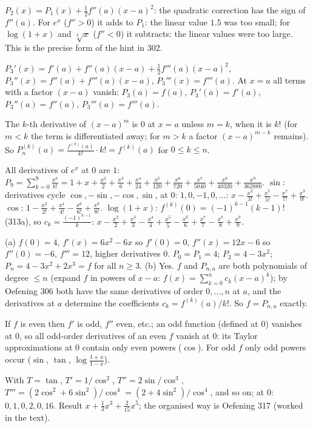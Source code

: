  $P_2(x)=P_1(x)+\frac12f''(a)(x-a)^2$: the quadratic correction has the sign of $f''(a)$. For $e^x$ ($f''>0$) it adds to $P_1$: the linear value $1.5$ was too small; for $\log(1+x)$ and $\sqrt[3]x$ ($f''<0$) it subtracts: the linear values were too large. This is the precise form of the hint in 302.

 $P_3'(x)=f'(a)+f''(a)(x-a)+\frac12f'''(a)(x-a)^2$, $P_3''(x)=f''(a)+f'''(a)(x-a)$, $P_3'''(x)=f'''(a)$. At $x=a$ all terms with a factor $(x-a)$ vanish: $P_3(a)=f(a)$, $P_3'(a)=f'(a)$, $P_3''(a)=f''(a)$, $P_3'''(a)=f'''(a)$.

 The $k$-th derivative of $(x-a)^m$ is $0$ at $x=a$ unless $m=k$, when it is $k!$ (for $m<k$ the term is differentiated away; for $m>k$ a factor $(x-a)^{m-k}$ remains). So $P_n^{(k)}(a)=\frac{f^{(k)}(a)}{k!}\cdot k!=f^{(k)}(a)$ for $0\le k\le n$.

 All derivatives of $e^x$ at $0$ are $1$: $P_9=\sum_{k=0}^9\frac{x^k}{k!}=1+x+\frac{x^2}2+\frac{x^3}6+\frac{x^4}{24}+\frac{x^5}{120}+\frac{x^6}{720}+\frac{x^7}{5040}+\frac{x^8}{40320}+\frac{x^9}{362880}$. $\sin$: derivatives cycle $\cos,-\sin,-\cos,\sin$, at $0$: $1,0,-1,0,\dots$: $x-\frac{x^3}{3!}+\frac{x^5}{5!}-\frac{x^7}{7!}+\frac{x^9}{9!}$. $\cos$: $1-\frac{x^2}{2!}+\frac{x^4}{4!}-\frac{x^6}{6!}+\frac{x^8}{8!}$. $\log(1+x)$: $f^{(k)}(0)=(-1)^{k-1}(k-1)!$ (313a), so $c_k=\frac{(-1)^{k-1}}k$: $x-\frac{x^2}2+\frac{x^3}3-\frac{x^4}4+\frac{x^5}5-\frac{x^6}6+\frac{x^7}7-\frac{x^8}8+\frac{x^9}9$.

 (a) $f(0)=4$, $f'(x)=6x^2-6x$ so $f'(0)=0$, $f''(x)=12x-6$ so $f''(0)=-6$, $f'''=12$, higher derivatives $0$. $P_0=P_1=4$; $P_2=4-3x^2$; $P_n=4-3x^2+2x^3=f$ for all $n\ge3$. (b) Yes. $f$ and $P_{n,a}$ are both polynomials of degree $\le n$ (expand $f$ in powers of $x-a$: $f(x)=\sum_{k=0}^nc_k(x-a)^k$); by Oefening 306 both have the same derivatives of order $0,\dots,n$ at $a$, and the derivatives at $a$ determine the coefficients $c_k=f^{(k)}(a)/k!$. So $f=P_{n,a}$ exactly.

 If $f$ is even then $f'$ is odd, $f''$ even, etc.; an odd function (defined at $0$) vanishes at $0$, so all odd-order derivatives of an even $f$ vanish at $0$: its Taylor approximations at $0$ contain only even powers ($\cos$). For odd $f$ only odd powers occur ($\sin$, $\tan$, $\log\frac{1+x}{1-x}$).

 With $T=\tan$, $T'=1/\cos^2$, $T''=2\sin/\cos^3$, $T'''=(2\cos^2+6\sin^2)/\cos^4=(2+4\sin^2)/\cos^4$, and so on; at $0$: $0,1,0,2,0,16$. Result $x+\frac13x^3+\frac2{15}x^5$; the organised way is Oefening 317 (worked in the text).

